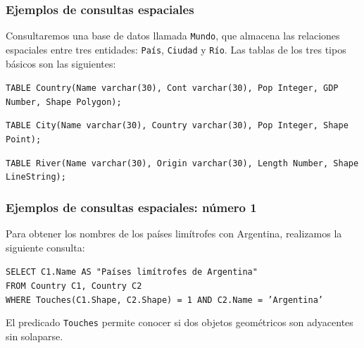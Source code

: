 \begin{frame}
	\frametitle{Ejemplos de consultas espaciales}

	Consultaremos una base de datos llamada \texttt{Mundo}, que almacena
	las relaciones espaciales entre tres entidades: \texttt{País},
	\texttt{Ciudad} y \texttt{Río}. Las tablas de los tres tipos básicos
	son las siguientes: \pause

	\medskip

	\texttt{TABLE Country(Name varchar(30), Cont varchar(30), Pop Integer,
		GDP Number, Shape Polygon);}

	\medskip

	\texttt{TABLE City(Name varchar(30), Country varchar(30), Pop Integer,
		Shape Point);}

	\medskip

	\texttt{TABLE River(Name varchar(30), Origin varchar(30), Length Number,
		Shape LineString);}
\end{frame}

\begin{frame}
\frametitle{Ejemplos de consultas espaciales: número 1}
	Para obtener los nombres de los países limítrofes con Argentina,
	realizamos la siguiente consulta:

	\medskip
	\pause

	\texttt{SELECT C1.Name AS "Países limítrofes de Argentina" \\
			FROM Country C1, Country C2 \\
			WHERE Touches(C1.Shape, C2.Shape) = 1 AND C2.Name = 'Argentina'
	}

	\medskip
	\pause

	El predicado \texttt{Touches} permite conocer si dos objetos geométricos
	son adyacentes sin solaparse.
\end{frame}
